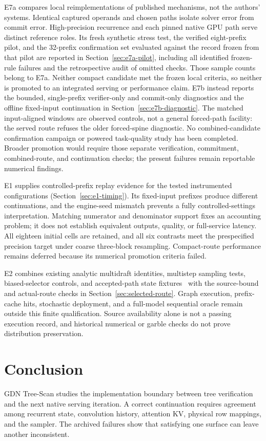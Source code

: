 \documentclass[conference]{IEEEtran}
\newcommand{\sys}{GDN Tree-Scan}
\begin{document}
E7a compares local reimplementations of published mechanisms, not the authors' systems. Identical captured operands and chosen paths isolate solver error from commit error. High-precision recurrence and each pinned native GPU path serve distinct reference roles. Its fresh synthetic stress test, the verified eight-prefix pilot, and the 32-prefix confirmation set evaluated against the record frozen from that pilot are reported in Section~\ref{sec:e7a-pilot}, including all identified frozen-rule failures and the retrospective audit of omitted checks. Those sample counts belong to E7a. Neither compact candidate met the frozen local criteria, so neither is promoted to an integrated serving or performance claim. E7b instead reports the bounded, single-prefix verifier-only and commit-only diagnostics and the offline fixed-input continuation in Section~\ref{sec:e7b-diagnostic}. The matched input-aligned windows are observed controls, not a general forced-path facility: the served route refuses the older forced-spine diagnostic. No combined-candidate confirmation campaign or powered task-quality study has been completed. Broader promotion would require those separate verification, commitment, combined-route, and continuation checks; the present failures remain reportable numerical findings.

E1 supplies controlled-prefix replay evidence for the tested instrumented configurations (Section~\ref{sec:e1-timing}). Its fixed-input prefixes produce different continuations, and the engine-seed mismatch prevents a fully controlled-settings interpretation. Matching numerator and denominator support fixes an accounting problem; it does not establish equivalent outputs, quality, or full-service latency. All eighteen initial cells are retained, and all six contrasts meet the prespecified precision target under coarse three-block resampling. Compact-route performance remains deferred because its numerical promotion criteria failed.

E2 combines existing analytic multidraft identities, multistep sampling tests, biased-selector controls, and accepted-path state fixtures~\cite{lumo2026archive} with the source-bound and actual-route checks in Section~\ref{sec:selected-route}. Graph execution, prefix-cache hits, stochastic deployment, and a full-model sequential oracle remain outside this finite qualification. Source availability alone is not a passing execution record, and historical numerical or garble checks do not prove distribution preservation.

\section{Conclusion}
\sys{} studies the implementation boundary between tree verification and the next native serving iteration. A correct continuation requires agreement among recurrent state, convolution history, attention KV, physical row mappings, and the sampler. The archived failures show that satisfying one surface can leave another inconsistent.
\end{document}
